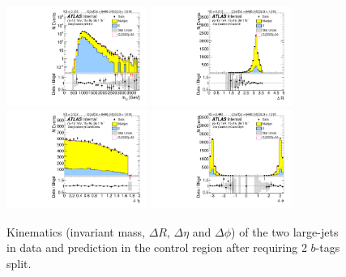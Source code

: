 \begin{figure}[htb!]
\begin{center}
\includegraphics[width=0.41\textwidth,angle=-90]{figures/boosted/Control/b77_TwoTag_split_Control_mHH_l_1.pdf}
\includegraphics[width=0.41\textwidth,angle=-90]{figures/boosted/Control/b77_TwoTag_split_Control_hCandDr.pdf}\\
\includegraphics[width=0.41\textwidth,angle=-90]{figures/boosted/Control/b77_TwoTag_split_Control_hCandDeta.pdf}
\includegraphics[width=0.41\textwidth,angle=-90]{figures/boosted/Control/b77_TwoTag_split_Control_hCandDphi.pdf}
  \caption{Kinematics (invariant mass, $\Delta R$, $\Delta \eta$ and $\Delta \phi$) of the two large-\R jets in data and prediction in the control region after requiring 2 $b$-tags split.  }
  \label{fig:boosted-2bs-control-ak10-system}
\end{center}
\end{figure}